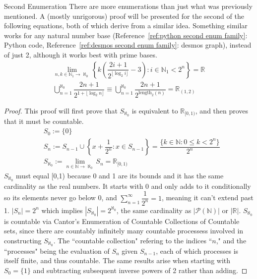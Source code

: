 \documentclass[12pt]{article}
\begin{document}
\begin{section}{Second Enumeration}\label{sec:second enumeration}
	There are more enumerations than just what was previously mentioned. A (mostly unrigorous) proof
	will be presented for the second of the following equations, both of which derive from a similar
	idea. Something similar works for any natural number base
	(Reference~\ref{ref:python second enum family}: Python code,
	Reference~\ref{ref:desmos second enum family}: desmos graph), instead of just 2, although it works
	best with prime bases.
	\begin{align}
	\lim_{n,k\in\mathbb N_1\to\aleph_0}\left\{k\!\left(\dfrac{2i+1}{2^{\lfloor\log_2i\rfloor}}-3\right):i\in\mathbb N_1<2^n\right\}=\mathbb R\\
	\bigcup_{n=1}^{\aleph_0}\dfrac{2n+1}{2^{1+\lfloor\log_2n\rfloor}}\equiv\bigcup_{n=1}^{\aleph_0}\dfrac{2n+1}{2^{\text{length}_2(n)}}=\mathbb R_{(1,2)}
	\end{align}
	\begin{proof} This proof will first prove that $S_{\aleph_0}$ is equivalent to $\mathbb R_{[0,1)}$,
	and then proves that it must be countable.
		\begin{align*}
			& S_0:=\{0\}\\
			& S_n:=S_{n-1}\cup\left\{x+\dfrac1{2^n}:x\in S_{n-1}\right\}=\dfrac{\{k\in\mathbb N:0\le k<2^n\}}{2^n}\\
			& S_{\aleph_0}:=\lim_{n\in\mathbb N\to\aleph_0}S_n=\mathbb R_{[0,1)}
		\end{align*}
		$S_{\aleph_0}$ must equal [0,1) because 0 and 1 are its bounds and it has the same cardinality
		as the real numbers. It starts with 0 and only adds to it conditionally so its elements never
		go below 0, and $\displaystyle\sum_{n=1}^\infty\dfrac1{2^n}=1$, meaning it can't extend past 1.
		$|S_n|=2^n$ which implies $|S_{\aleph_0}|=2^{\aleph_0}$, the same cardinality as
		$|\mathcal P(\mathbb N)|$ or $|\mathbb R|$. $S_{\aleph_0}$ is countable via Cantor's Enumeration
		of Countable Collections of Countable sets, since there are countably infinitely many countable
		processess involved in constructing $S_{\aleph_0}$. The ``countable collection" refering to the
		indices ``$n$," and the ``processes" being the evaluation of $S_n$ given $S_{n-1}$, each of which
		processes is itself finite, and thus countable. The same results arise when starting with $S_0=\{1\}$
		and subtracting subsequent inverse powers of 2 rather than adding.
	\end{proof}
\end{section}
\end{document}
